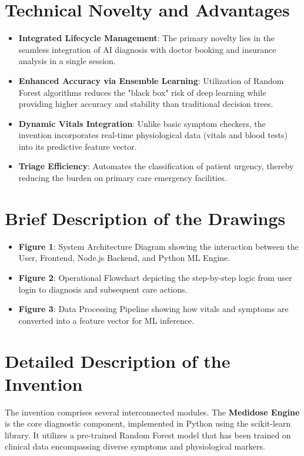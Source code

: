 \documentclass[12pt,a4paper]{article}
\begin{document}
\section{Technical Novelty and Advantages}
\begin{itemize}[leftmargin=*, label=\textbullet]
    \item \textbf{Integrated Lifecycle Management}: The primary novelty lies in the seamless integration of AI diagnosis with doctor booking and insurance analysis in a single session.
    \item \textbf{Enhanced Accuracy via Ensemble Learning}: Utilization of Random Forest algorithms reduces the "black box" risk of deep learning while providing higher accuracy and stability than traditional decision trees.
    \item \textbf{Dynamic Vitals Integration}: Unlike basic symptom checkers, the invention incorporates real-time physiological data (vitals and blood tests) into its predictive feature vector.
    \item \textbf{Triage Efficiency}: Automates the classification of patient urgency, thereby reducing the burden on primary care emergency facilities.
\end{itemize}

\section{Brief Description of the Drawings}
\begin{itemize}[leftmargin=*, label=\textbullet]
    \item \textbf{Figure 1}: System Architecture Diagram showing the interaction between the User, Frontend, Node.js Backend, and Python ML Engine.
    \item \textbf{Figure 2}: Operational Flowchart depicting the step-by-step logic from user login to diagnosis and subsequent care actions.
    \item \textbf{Figure 3}: Data Processing Pipeline showing how vitals and symptoms are converted into a feature vector for ML inference.
\end{itemize}

\section{Detailed Description of the Invention}
The invention comprises several interconnected modules. The \textbf{Medidose Engine} is the core diagnostic component, implemented in Python using the scikit-learn library. It utilizes a pre-trained Random Forest model that has been trained on clinical data encompassing diverse symptoms and physiological markers.
\end{document}
